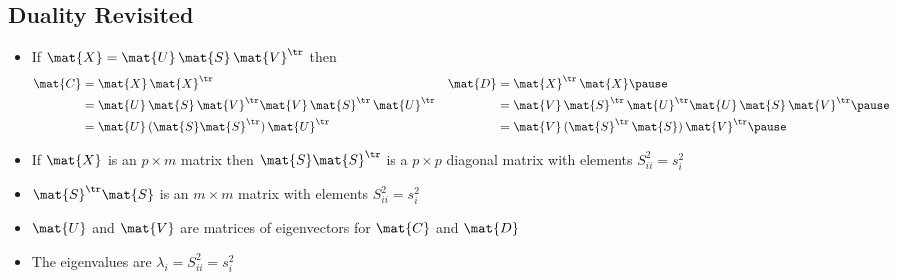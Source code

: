 \begin{slide}
\section[-2]{Duality Revisited}

\begin{PauseHighLight}
  \begin{itemize}
  \item If $\mat{X} = \mat{U}\,\mat{S}\,\mat{V}^\tr$ then
    \begin{align*}
      \mat{C} &= \mat{X}\, \mat{X}^\tr & \mat{D}  &= \mat{X}^\tr\, \mat{X}\pause\\
      &= \mat{U}\,\mat{S}\,\mat{V}^\tr\mat{V}\,\mat{S}^\tr\,\mat{U}^\tr &
      &=
        \mat{V}\,\mat{S}^\tr\,\mat{U}^\tr\mat{U}\,\mat{S}\,\mat{V}^\tr\pause\\
      &= \mat{U}\,(\mat{S}\mat{S}^\tr)\,\mat{U}^\tr  &
      &=
        \mat{V}\,(\mat{S}^\tr\,\mat{S})\,\mat{V}^\tr\pause                        
    \end{align*}
  \item If $\mat{X}$ is an $p\times m$ matrix then $\mat{S}\mat{S}^\tr$
    is a $p\times p$ diagonal matrix with elements $S_{ii}^2=s_i^2$\pause
  \item $\mat{S}^\tr\mat{S}$  is an $m\times m$ matrix  with elements
    $S_{ii}^2=s_i^2$\pause
  \item $\mat{U}$ and $\mat{V}$ are matrices of eigenvectors for
    $\mat{C}$ and $\mat{D}$\pause
  \item The eigenvalues are $\lambda_i = S_{ii}^2 = s_i^2$\pause
  \end{itemize}
\end{PauseHighLight}

\end{slide}


